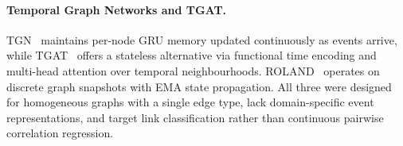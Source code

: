 \documentclass[runningheads]{llncs}
\begin{document}


\paragraph{Temporal Graph Networks and TGAT.}
TGN~\cite{rossi2020temporal} maintains per-node GRU memory updated continuously as events arrive, while TGAT~\cite{xu2020inductive} offers a stateless alternative via functional time encoding and multi-head attention over temporal neighbourhoods. ROLAND~\cite{you2022roland} operates on discrete graph snapshots with EMA state propagation. All three were designed for homogeneous graphs with a single edge type, lack domain-specific event representations, and target link classification rather than continuous pairwise correlation regression.
\end{document}
